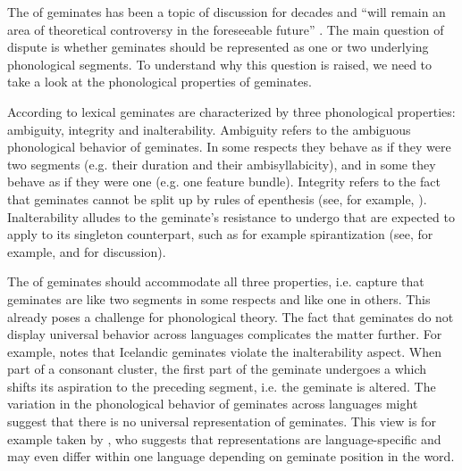 The  of geminates has been a topic of discussion for decades and  ``will remain an area of theoretical controversy in the foreseeable future'' \cite[22]{Davis.2011}. The main question of dispute is whether geminates should be represented as one or two underlying phonological segments. To understand why this question is raised, we need to take a look at the phonological properties of geminates. 

According to \cite{Hayes.1986b}  lexical geminates are characterized by three phonological properties: ambiguity, integrity and inalterability. Ambiguity refers to the ambiguous phonological behavior of geminates. In some respects they behave as if they were two segments (e.g. their duration and their ambisyllabicity), and in some they behave as if they were one (e.g. one feature bundle). Integrity refers to the fact that geminates  cannot be split up by rules of epenthesis (see, for example,  \citealt{AbuSalim.,Kenstowicz.1994}).  Inalterability alludes to the {geminate's} resistance to undergo  that are expected to apply to its singleton counterpart, such as for example spirantization (see, for example, \citealt {Kenstowicz.1994} and \citealt[chapter 5]{Kirchner.2001} for discussion). 

The  of geminates should accommodate all three properties, i.e. capture that geminates are like two segments in some respects and like one in others. This already poses a challenge for phonological theory. The fact that geminates do not display universal behavior across languages complicates the matter further. For example, \cite{Kenstowicz.1994} notes that Icelandic geminates violate the inalterability aspect. When part of a consonant cluster, the first part of the geminate undergoes a  which shifts its aspiration to the preceding segment, i.e. the geminate is altered.
 The variation in the phonological behavior of geminates across languages might suggest that there is no universal representation of geminates.  This view is for example taken by \cite{Ham.2001}, who suggests that representations are language-specific and may even differ within one language depending on geminate position in the word.
 
